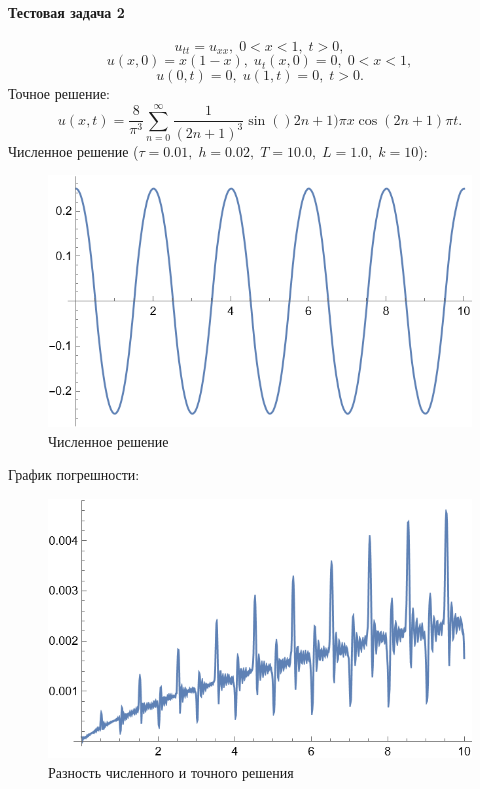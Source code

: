 \documentclass[12pt, a4paper]{article}
\begin{document}
	\paragraph{Тестовая задача 2}
\[
u_{tt}=u_{xx},\;0<x<1,\;t>0,
\]
\[
u(x,0)=x(1-x),\; u_t(x,0)=0,\;0<x<1,
\]
\[
u(0,t)=0,\;u(1,t)=0,\;t>0.
\]
Точное решение:
\[
u(x,t)=\frac{8}{\pi^3}\sum\limits_{n=0}^{\infty}\frac{1}{(2n+1)^3}\sin{()2n+1)\pi x}\cos{(2n+1)\pi t}.
\]
Численное решение ($\tau = 0.01,\;h=0.02,\;T=10.0,\;L=1.0,\;k=10$):	
\begin{figure}[H]
	\centering
	\includegraphics[width=0.7\linewidth]{test2numerical}
	\caption{Численное решение}
\end{figure}
График погрешности:
\begin{figure}[H]
	\centering
	\includegraphics[width=0.7\linewidth]{test2pogr}
	\caption{Разность численного и точного решения}
\end{figure}
\end{document}
